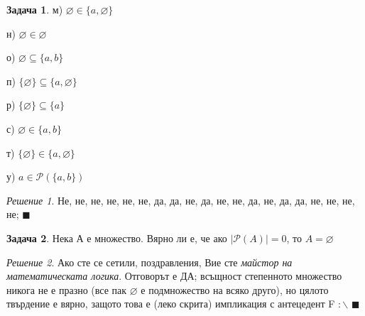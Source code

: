 \documentclass[10pt, a4paper]{article}
\theoremstyle{definition}
\newtheorem{problem}{Задача}
\theoremstyle{remark}
\newtheorem*{sol}{Решение}
\begin{document}
\begin{problem}
    \begin{minipage}[t]{0.25\textwidth}
        м) $\varnothing\in\{a,\varnothing\}$
    \end{minipage}
    \begin{minipage}[t]{0.25\textwidth}
        н) $\varnothing\in\varnothing$
    \end{minipage}
    \begin{minipage}[t]{0.25\textwidth}
        о) $\varnothing\subseteq\{a,b\}$
    \end{minipage}
    \begin{minipage}[t]{0.25\textwidth}
        п) $\{\varnothing\}\subseteq\{a,\varnothing\}$
    \end{minipage}
    \vspace{0.1cm}
    
    \begin{minipage}[t]{0.25\textwidth}
        р) $\{\varnothing\}\subseteq\{a\}$
    \end{minipage}
    \begin{minipage}[t]{0.25\textwidth}
        с) $\varnothing\in\{a,b\}$
    \end{minipage}
    \begin{minipage}[t]{0.25\textwidth}
        т) $\{\varnothing\}\in\{a,\varnothing\}$
    \end{minipage}
    \begin{minipage}[t]{0.25\textwidth}
        у) $a\in\mathcal{P}(\{a,b\})$
    \end{minipage}
\end{problem}
\hfill
\begin{sol}
    Не, не, не, не, не, не, да, да, не, да, не, не, да, не, да, да, не, не, не, не; $\blacksquare$
\end{sol}

\hfill
\begin{problem}
    Нека А е множество. Вярно ли е, че ако \(|\mathcal{P}(A)|=0\), то \(A=\varnothing\)
\end{problem}
\begin{sol}
    Ако сте се сетили, поздравления, Вие сте \emph{майстор на математическата логика}. Отговорът е ДА; всъщност степенното множество никога не е празно (все пак \(\varnothing\) е подмножество на всяко друго), но цялото твърдение е вярно, защото това е (леко скрита) импликация с антецедент F \(:\backslash\) \(\blacksquare\) 
\end{sol}
\end{document}
